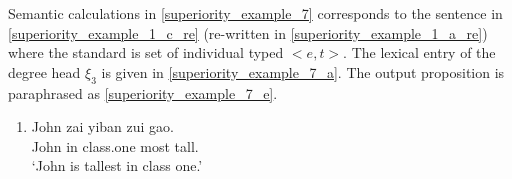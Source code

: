 \documentclass{ctexart}
\begin{document}
Semantic calculations in \ref{superiority_example_7} corresponds to the sentence in \ref{superiority_example_1_c_re} (re-written in \ref{superiority_example_1_a_re}) where the standard is set of individual typed $<e,t>$. The lexical entry of the degree head $\xi_3$ is given in \ref{superiority_example_7_a}. The output proposition is paraphrased as \ref{superiority_example_7_e}.

\begin{enumerate}
    \item \label{superiority_example_1_c_re}
    John zai \enspace yiban \enspace \enspace zui \enspace gao. \\
    John in \enspace class.one most tall. \\
    `John is tallest in class one.' 
\end{enumerate}
\end{document}
